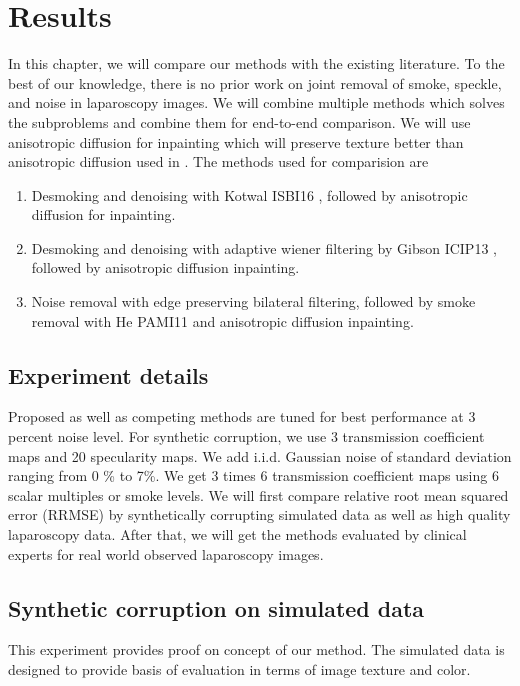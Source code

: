 \chapter{Results}

In this chapter, we will compare our methods with the existing literature. To the best of our knowledge, there is no prior work on joint removal of smoke, speckle, and noise in laparoscopy images. We will combine multiple methods which solves the subproblems and combine them for end-to-end comparison. We will use anisotropic diffusion for inpainting which will preserve texture better than anisotropic diffusion used in \cite{saint2011detection, arnold2010speckle}. The methods used for comparision are
\begin{enumerate}
    \item Desmoking and denoising with Kotwal ISBI16 \cite{kotwal2016joint}, followed by anisotropic diffusion for inpainting.
    \item Desmoking and denoising with adaptive wiener filtering by Gibson ICIP13 \cite{gibson2013wiener}, followed by anisotropic diffusion inpainting.
    \item Noise removal with edge preserving bilateral filtering, followed by smoke removal with He PAMI11 \cite{he2011dark} and anisotropic diffusion inpainting.
\end{enumerate}

\section{Experiment details}
Proposed as well as competing methods are tuned for best performance at 3 percent noise level. For synthetic corruption, we use 3 transmission coefficient maps and 20 specularity maps. We add i.i.d. Gaussian noise of standard deviation ranging from 0 \% to 7\%. We get 3 times 6 transmission coefficient maps using 6 scalar multiples or smoke levels. We will first compare relative root mean squared error (RRMSE) by synthetically corrupting simulated data as well as high quality laparoscopy data. After that, we will get the methods evaluated by clinical experts for real world observed laparoscopy images.

\section{Synthetic corruption on simulated data}
This experiment provides proof on concept of our method. The simulated data is designed to provide basis of evaluation in terms of image texture and color.


